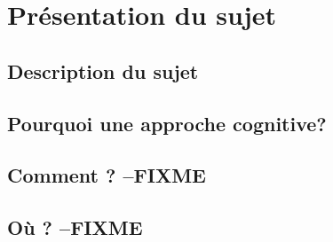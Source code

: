 \part{Présentation du sujet}

\clearemptydoublepage
\chapter{Description du sujet} 


\clearemptydoublepage
\chapter{Pourquoi une approche cognitive?} 


\clearemptydoublepage
\chapter{Comment ? --FIXME}


\clearemptydoublepage
\chapter{Où ? --FIXME}
